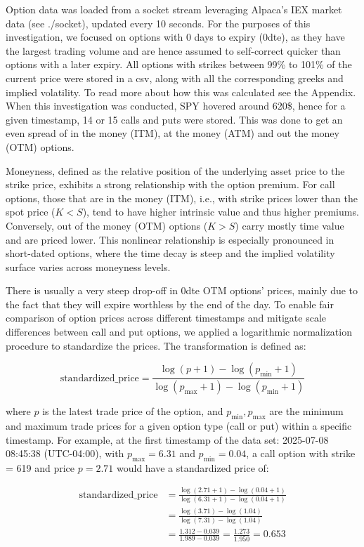 \documentclass{article}
\begin{document}
Option data was loaded from a socket stream leveraging Alpaca's IEX market data (see ./socket), updated every 10 seconds. For the purposes of this investigation, we focused on options with 0 days to expiry (0dte), as they have the largest trading volume and are hence assumed to self-correct quicker than options with a later expiry. All options with strikes between 99\% to 101\% of the current price were stored in a csv, along with all the corresponding greeks and implied volatility. To read more about how this was calculated see the Appendix. When this investigation was conducted, SPY hovered around 620\$, hence for a given timestamp, 14 or 15 calls and puts were stored. This was done to get an even spread of in the money (ITM), at the money (ATM) and out the money (OTM) options.

Moneyness, defined as the relative position of the underlying asset price to the strike price, exhibits a strong relationship with the option premium. For call options, those that are in the money (ITM), i.e., with strike prices lower than the spot price (\(K < S\)), tend to have higher intrinsic value and thus higher premiums. Conversely, out of the money (OTM) options (\(K > S\)) carry mostly time value and are priced lower. This nonlinear relationship is especially pronounced in short-dated options, where the time decay is steep and the implied volatility surface varies across moneyness levels.

There is usually a very steep drop-off in 0dte OTM options' prices, mainly due to the fact that they will expire worthless by the end of the day. To enable fair comparison of option prices across different timestamps and mitigate scale differences between call and put options, we applied a logarithmic normalization procedure to standardize the prices. The transformation is defined as:

\[
\text{standardized\_price} = \frac{\log(p + 1) - \log(p_{\min} + 1)}{\log(p_{\max} + 1) - \log(p_{\min} + 1)}
\]

where \(p\) is the latest trade price of the option, and \(p_{\min}, p_{\max}\) are the minimum and maximum trade prices for a given option type (call or put) within a specific timestamp. For example, at the first timestamp of the data set: 2025-07-08 08:45:38 (UTC-04:00), with \(p_{\max} = 6.31\) and \(p_{\min} = 0.04\), a call option with strike = 619 and price \(p = 2.71\) would have a standardized price of:

\begin{align}
\text{standardized\_price} &= \frac{\log(2.71 + 1) - \log(0.04 + 1)}{\log(6.31 + 1) - \log(0.04 + 1)} \nonumber \\
&= \frac{\log(3.71) - \log(1.04)}{\log(7.31) - \log(1.04)} \nonumber \\
&= \frac{1.312 - 0.039}{1.989 - 0.039} = \frac{1.273}{1.950} = 0.653
\end{align}
\end{document}
